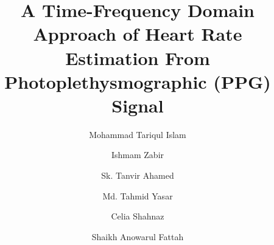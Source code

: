 \documentclass[final,3p,times,authoryear]{elsarticle}
\begin{document}
\begin{frontmatter}

\title{{\bf{\huge{A Time-Frequency Domain Approach of  Heart Rate Estimation From Photoplethysmographic (PPG) Signal}}}}
\author[buet]{Mohammad Tariqul Islam}
\author[buet,ucr]{Ishmam Zabir}
\author[buet]{Sk. Tanvir Ahamed}
\author[buet]{Md. Tahmid Yasar}
\author[buet]{Celia Shahnaz}
 
\author[buet]{Shaikh Anowarul Fattah}
\address[buet]{Department of Electrical and Electronic Engineering,
    Bangladesh University of Engineering and Technology (BUET), Dhaka
    1205, Bangladesh}
\address[ucr]{Department of Electrical and Computer Engineering, University of California Riverside, 900 University Ave, Riverside, CA 92521}

\begin{abstract}


\end{abstract}
\end{frontmatter}
\end{document}
